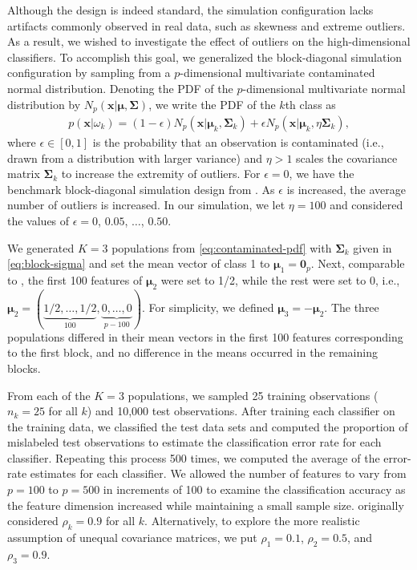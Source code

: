 \documentclass[]{interact}\usepackage[]{graphicx}\usepackage[]{color}
\begin{document}
Although the design is indeed standard, the simulation configuration lacks
artifacts commonly observed in real data, such as skewness and extreme
outliers. As a result, we wished to investigate the effect of outliers on the
high-dimensional classifiers. To accomplish this goal, we generalized the
block-diagonal simulation configuration by sampling from a $p$-dimensional
multivariate contaminated normal distribution.  Denoting the PDF of the
$p$-dimensional multivariate normal distribution by $N_p(\bm x | \bm \mu, \bm
\Sigma)$, we write the PDF of the $k$th class as
\begin{align}
  p(\bm x | \omega_k) = (1 - \epsilon) N_p(\bm x | \bm \mu_k, \bm \Sigma_k) + \epsilon N_p(\bm x | \bm \mu_k, \eta \bm \Sigma_k),\label{eq:contaminated-pdf}
\end{align}
where $\epsilon \in [0, 1]$ is the probability that an observation is
contaminated (i.e., drawn from a distribution with larger variance) and $\eta >
1$ scales the covariance matrix $\bm \Sigma_k$ to increase the extremity of
outliers. For $\epsilon = 0$, we have the benchmark block-diagonal simulation
design from \cite{Guo:2007te}. As $\epsilon$ is increased, the average number of
outliers is increased. In our simulation, we let $\eta = 100$ and considered the
values of $\epsilon = 0$, $0.05$, $\ldots$, $0.50$.

We generated $K=3$ populations from \eqref{eq:contaminated-pdf} with $\bm
\Sigma_k$ given in \eqref{eq:block-sigma} and set the mean vector of class 1 to
$\bm \mu_1 = \bm 0_p$. Next, comparable to \cite{Guo:2007te}, the first 100
features of $\bm \mu_2$ were set to 1/2, while the rest were set to 0, i.e.,
$\bm \mu_2 = (\underbrace{1/2, \ldots, 1/2}_{100}, \underbrace{0, \ldots, 0}_{p
  - 100})$. For simplicity, we defined $\bm \mu_3 = -\bm \mu_2$. The three
populations differed in their mean vectors in the first 100 features
corresponding to the first block, and no difference in the means occurred in the
remaining blocks.

From each of the $K=3$ populations, we sampled 25 training observations ($n_k =
25$ for all $k$) and 10,000 test observations. After training each classifier on
the training data, we classified the test data sets and computed the proportion
of mislabeled test observations to estimate the classification error rate for
each classifier. Repeating this process 500 times, we computed the average of
the error-rate estimates for each classifier. We allowed the number of features
to vary from $p = 100$ to $p = 500$ in increments of 100 to examine the
classification accuracy as the feature dimension increased while maintaining a
small sample size. \cite{Guo:2007te} originally considered $\rho_k = 0.9$ for
all $k$. Alternatively, to explore the more realistic assumption of unequal
covariance matrices, we put $\rho_1 = 0.1$, $\rho_2 = 0.5$, and $\rho_3 = 0.9$.
\end{document}
